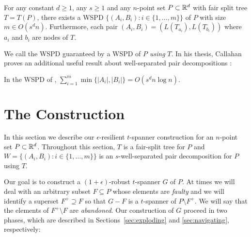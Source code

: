 \documentclass{patmorin}
\begin{document}
\begin{thm}
  For any constant $d\ge 1$, any $s\ge 1$ and any $n$-point set
  $P\subset\mathbb{R}^d$ with fair split tree $T=T(P)$, there exists a WSPD
  $\{(A_i,B_i):i\in\{1,\ldots,m\}\}$ of $P$ with size $m\in O(s^d n)$.
  Furthermore, each pair $(A_i,B_i)=(L(T_{a_i}),L(T_{b_i}))$ where $a_i$
  and $b_i$ are nodes of $T$.
\end{thm}
We call the WSPD guaranteed by  a WSPD of $P$ \emph{using}
$T$.  In his thesis, Callahan proves an additional useful result about
well-separated pair decompositions \cite[Section~4.5]{callahan:dealing}:

\begin{lem}[Callahan 1995]
  In the WSPD of ,
   $\sum_{i=1}^m\min\{|A_i|,|B_i|\} = O(s^d n\log n)$.
\end{lem}


\section{The Construction}

In this section we describe our $\epsilon$-resilient
$t$-spanner construction for an $n$-point set $P\subset\mathbb{R}^d$.
Throughout this section, $T$ is a fair-split tree for $P$ and
$W=\{(A_i,B_i):i\in\{1,\ldots,m\}\}$ is an $s$-well-separated pair
decomposition for $P$ using $T$.

Our goal is to construct a $(1+\epsilon)$-robust $t$-spanner $G$
of $P$.  At times we will deal with an arbitrary subset $F\subseteq
P$ whose elements are \emph{faulty} and we will identify a superset
$F^+\supseteq F$ so that $G-F$ is a $t$-spanner of $P\setminus F^+$.
We will say that the elements of $F^+\setminus F$ are \emph{abandoned}.
Our construction of $G$ proceed in two phases, which are described
in Sections~\ref{sec:exploding} and \ref{sec:navigating}, respectively:
\end{document}
